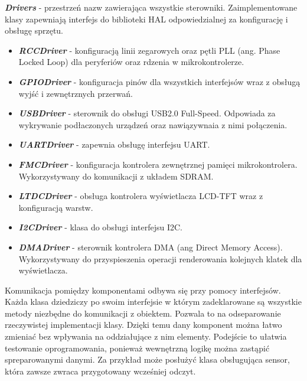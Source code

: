 \documentclass[eng,printmode]{mgr}
\begin{document}
\noindent
\textbf{\textit{Drivers}} - przestrzeń nazw zawierająca wszystkie sterowniki. Zaimplementowane klasy zapewniają interfejs do biblioteki HAL odpowiedzialnej za konfigurację i obsługę sprzętu.
\begin{itemize}[label={}]
  \item \textbf{\textit{RCCDriver}} - konfiguracją linii zegarowych oraz pętli PLL (ang. Phase Locked Loop) dla peryferiów oraz rdzenia w mikrokontrolerze. 
  \item \textbf{\textit{GPIODriver}} - konfiguracja pinów dla wszystkich interfejsów wraz z obsługą wyjść i zewnętrznych przerwań.
  \item \textbf{\textit{USBDriver}} - sterownik do obsługi USB2.0 Full-Speed. Odpowiada za wykrywanie podłaczonych urządzeń oraz nawiązywnaia z nimi połączenia.
  \item \textbf{\textit{UARTDriver}} - zapewnia obsługę interfejsu UART.
  \item \textbf{\textit{FMCDriver}} - konfiguracja kontrolera zewnętrznej pamięci mikrokontrolera. Wykorzystywany do komunikacji z układem SDRAM.
  \item \textbf{\textit{LTDCDriver}} - obsługa kontrolera wyświetlacza LCD-TFT wraz z konfiguracją warstw.  
  \item \textbf{\textit{I2CDriver}} - klasa do obsługi interfejsu I2C.
  \item \textbf{\textit{DMADriver}} - sterownik kontrolera DMA (ang Direct Memory Access). Wykorzystywany do przyspieszenia operacji renderowania kolejnych klatek dla wyświetlacza.
\end{itemize}


Komunikacja pomiędzy komponentami odbywa się przy pomocy interfejsów. Każda klasa dziedziczy po swoim interfejsie w którym zadeklarowane są wszystkie metody niezbędne do komunikacji z obiektem. Pozwala to na odseparowanie rzeczywistej implementacji klasy. Dzięki temu dany komponent można łatwo zmieniać bez wpływania na oddziałujące z nim elementy. Podejście to ułatwia testowanie oprogramowania, ponieważ wewnętrzną logikę można zastąpić spreparowanymi danymi. Za przykład może posłużyć klasa obsługująca sensor, która zawsze zwraca przygotowany wcześniej odczyt. 
\end{document}
